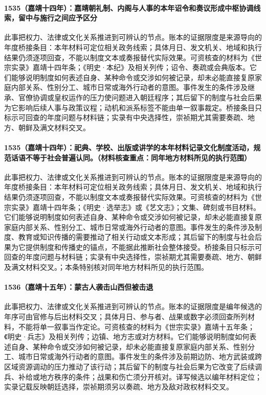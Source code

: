 \paragraph{1535（嘉靖十四年）：嘉靖朝礼制、内阁与人事的本年诏令和奏议形成中枢协调线索，留中与施行之间应予区分} 此事把权力、法律或文化关系推进到可辨认的节点。账本的证据限度是来源导向的年度桥接条目：本年材料可定位相关政务线索；具体月日、发文机关、地域和执行结果仍须逐项回查，不能以制度文本或奏报替代实际效果。可资核查的材料为《世宗实录》嘉靖十四年条；《明史·本纪》及相关列传；诏令、奏疏或会典版本。它们能够说明制度如何表述自身、某种命令或交涉如何被记录，却未必能直接复原家庭内部关系、性别分工、城市日常或海外行动者的意图。事件发生的条件涉及继承、官僚协调或皇权运作的压力使问题进入朝廷程序；其后留下的制度与社会后果为它影响后续人事与政策议程；动机和派系标签不能由单一叙事裁定。桥接条目只标示可回查的年度问题与材料链；实录有中央选择性，崇祯期尤其需要奏疏、地方、朝鲜及满文材料交叉。

\paragraph{1535（嘉靖十四年）：祀典、学校、出版或讲学的本年材料记录文化制度活动，规范话语不等于社会普遍认同。（材料核查重点：同年地方材料所见的执行范围）} 此事把权力、法律或文化关系推进到可辨认的节点。账本的证据限度是来源导向的年度桥接条目：本年材料可定位相关政务线索；具体月日、发文机关、地域和执行结果仍须逐项回查，不能以制度文本或奏报替代实际效果。可资核查的材料为《世宗实录》嘉靖十四年条；《明史·选举志》或《艺文志》；文集、碑刻或书目材料。它们能够说明制度如何表述自身、某种命令或交涉如何被记录，却未必能直接复原家庭内部关系、性别分工、城市日常或海外行动者的意图。事件发生的条件涉及制度、教育或知识传播的需要推动了相关行动或文本形成；其后留下的制度与社会后果为它提供制度和传播史的锚点，不能据此推断社会整体接受。桥接条目只标示可回查的年度问题与材料链；实录有中央选择性，崇祯期尤其需要奏疏、地方、朝鲜及满文材料交叉。；本条特别核对同年地方材料所见的执行范围。

\paragraph{1536（嘉靖十五年）：蒙古人袭击山西但被击退} 此事把权力、法律或文化关系推进到可辨认的节点。账本的证据限度是编年候选的年序可由官修与后出材料交叉；具体月日、参与者、战果或数字必须回查所列材料，不能将单一叙事当作定论。可资核查的材料为《世宗实录》嘉靖十五年条；《明史·兵志》及相关列传；边镇、地方志或对方材料。它们能够说明制度如何表述自身、某种命令或交涉如何被记录，却未必能直接复原家庭内部关系、性别分工、城市日常或海外行动者的意图。事件发生的条件涉及前期边防、地方武装或跨区域资源调动的压力推动了该行动；其后留下的制度与社会后果为它改变了后续调兵、补给或地方秩序的条件；战果和伤亡须分开核对。译写候选以编年材料定位；实录记载反映朝廷选择，崇祯期须另以奏疏、地方及敌对政权材料交叉。

